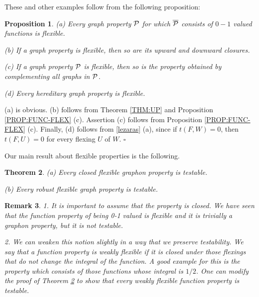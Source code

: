 \documentclass{article}
\newtheorem{theorem}{Theorem}[section]
\newtheorem{prop}[theorem]{Proposition}
\newtheorem{remark}[theorem]{Remark}
\newenvironment{proof}{\medskip\noindent{\bf Proof. }}{\hfill$\square$\medskip}
\begin{document}
These and other examples follow from the following proposition:

\begin{prop}\label{PROP:GRAPH-FLEX}
{\rm (a)} Every graph property $\mathcal{P}$ for which $\overline{\mathcal{P}}$
consists of $0-1$ valued functions is flexible.

\smallskip

{\rm (b)} If a graph property is flexible, then so are its upward and
downward closures.

\smallskip

{\rm (c)} If a graph property $\mathcal{P}$ is flexible, then so is the
property obtained by complementing all graphs in $\mathcal{P}$.

\smallskip

{\rm (d)} Every hereditary graph property is flexible.
\end{prop}

\begin{proof}
(a) is obvious. (b) follows from Theorem \ref{THM:UP} and Proposition
\ref{PROP:FUNC-FLEX} (c). Assertion (c) follows from Proposition
\ref{PROP:FUNC-FLEX} (c). Finally, (d) follows from \ref{lezaras}
(a), since if $t(F,W)=0$, then $t(F,U)=0$ for every flexing $U$ of
$W$.
\end{proof}

Our main result about flexible properties is the following.

\begin{theorem}\label{FLEX-TEST}
{\rm (a)} Every closed flexible graphon property is testable.

\smallskip

{\rm (b)} Every robust flexible graph property is testable.
\end{theorem}

\begin{remark}
1. It is important to assume that the property is closed. We have
seen that the function property of being 0-1 valued is flexible and
it is trivially a graphon property, but it is not testable.

2. We can weaken this notion slightly in a way that we preserve
testability. We say that a function property is {\it weakly flexible}
if it is closed under those flexings that do not change the integral
of the function. A good example for this is the property which
consists of those functions whose integral is $1/2$. One can modify
the proof of Theorem \ref{FLEX-TEST} to show that every weakly
flexible function property is testable.
\end{remark}
\end{document}
